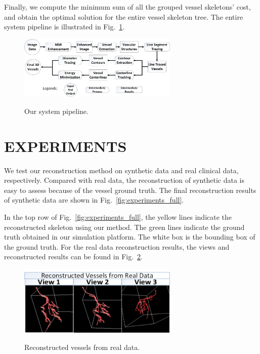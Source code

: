 \documentclass[10pt, conference, compsocconf]{IEEEtran}
\begin{document}
Finally, we compute the minimum sum of all the grouped vessel
skeletons' cost, and obtain the optimal solution for the entire vessel
skeleton tree. The entire system pipeline is illustrated in
Fig.~\ref{fig:Pipeline}.
\begin{figure}
  \centering
  \includegraphics[width=3.0in]{procedure.png}\\
  \caption{Our system pipeline.}\label{fig:Pipeline}
\end{figure}


\section{EXPERIMENTS}

We test our reconstruction method on synthetic data and real clinical
data, respectively. Compared with real data, the reconstruction of
synthetic data is easy to assess because of the vessel ground truth.
The final reconstruction results of synthetic data are shown in
Fig.~\ref{fig:experiments_full}.

In the top row of Fig.~\ref{fig:experiments_full}, the yellow lines
indicate the reconstructed skeleton using our method. The green lines
indicate the ground truth obtained in our simulation platform. The
white box is the bounding box of the ground truth. For the real data
reconstruction results, the views and reconstructed results can be
found in Fig.~\ref{fig:real_reconstructed_data}.

\begin{figure}
  \centering
  \includegraphics[width=3.0in]{real_data_final.png}\\
  \caption{Reconstructed vessels from real
    data.}\label{fig:real_reconstructed_data}
\end{figure}
\end{document}
